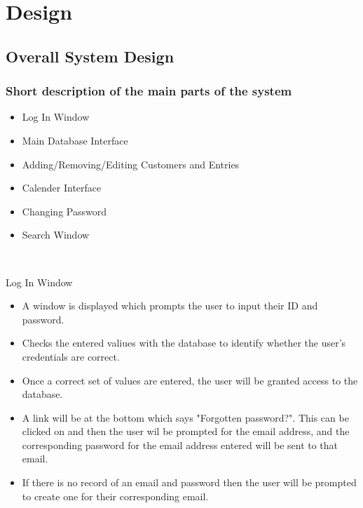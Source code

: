 \chapter{Design}

\section{Overall System Design}

\subsection{Short description of the main parts of the system}

\begin{itemize}
\item Log In Window
\item Main Database Interface
\item Adding/Removing/Editing Customers and Entries
\item Calender Interface
\item Changing Password
\item Search Window
\end{itemize}

\

Log In Window
\begin{itemize}
    \item A window is displayed which prompts the user to input their ID and password.
    \item Checks the entered valiues with the database to identify whether the user's credentials are correct.
    \item Once a correct set of values are entered, the user will be granted access to the database.
    \item A link will be at the bottom which says "Forgotten password?". This can be clicked on and then the user wil be prompted for the email address, and the corresponding password for the email address entered will be sent to that email.
    \item If there is no record of an email and password then the user will be prompted to create one for their corresponding email.
\end{itemize}

\
  
